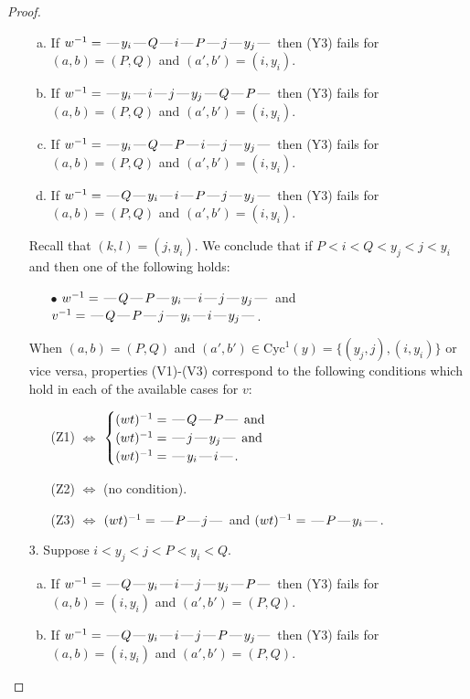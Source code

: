 \documentclass[10pt]{article}
\theoremstyle{definition}
\theoremstyle{definition}
\def\dash{\text{\hspace{0.5mm}---\hspace{0.5mm}}}
\def\Cyc{\mathrm{Cyc}}
\begin{document}
\begin{proof}
\begin{enumerate}
\begin{enumerate}[(a)]
\item If $w^{-1} = \dash y_i\dash Q\dash i\dash P\dash j\dash y_j\dash $ then (Y3) fails for $(a,b)=(P,Q)$ and $(a',b')=(i,y_i)$.
\item If $w^{-1} = \dash y_i\dash i\dash j\dash y_j\dash Q\dash P\dash $ then (Y3) fails for $(a,b)=(P,Q)$ and $(a',b')=(i,y_i)$.
\item If $w^{-1} = \dash y_i\dash Q\dash P\dash i\dash j\dash y_j\dash $ then (Y3) fails for $(a,b)=(P,Q)$ and $(a',b')=(i,y_i)$.
\item If $w^{-1} = \dash Q\dash y_i\dash i\dash P\dash j\dash y_j\dash $ then (Y3) fails for $(a,b)=(P,Q)$ and $(a',b')=(i,y_i)$.
\end{enumerate}
Recall that $(k,l) = (j,y_i)$.
We conclude that if $P < i < Q < y_j < j < y_i$ and then one of the following holds:
\begin{enumerate}
\item[$\bullet$] $w^{-1} = \dash Q\dash P\dash y_i\dash i\dash j\dash y_j\dash $ and $v^{-1} = \dash Q\dash P\dash j\dash y_i\dash i\dash y_j\dash $.
\end{enumerate}
When $(a,b)= (P,Q)$ and $(a',b')\in \Cyc^1(y)=\{(y_j,j),(i,y_i)\}$ or vice versa,
properties (V1)-(V3) correspond to the following conditions which hold in
each of the available cases for $v$:
\begin{enumerate}
\item[](Z1) $\Leftrightarrow$ $\begin{cases}\text{$(wt)^{-1} = \dash Q \dash P \dash$}\text{ and }\\
\text{$(wt)^{-1} = \dash j \dash y_j \dash$}\text{ and }\\
\text{$(wt)^{-1} = \dash y_i \dash i \dash$}.\end{cases}$
\item[](Z2) $\Leftrightarrow$ (no condition).
\item[](Z3) $\Leftrightarrow$ $(wt)^{-1} = \dash P \dash j \dash$  and $(wt)^{-1} = \dash P \dash y_i \dash$.
\end{enumerate}
\item[$3$.] Suppose $i < y_j < j < P < y_i < Q$.
\begin{enumerate}[(a)]
\item If $w^{-1} = \dash Q\dash y_i\dash i\dash j\dash y_j\dash P\dash $ then (Y3) fails for $(a,b)=(i,y_i)$ and $(a',b')=(P,Q)$.
\item If $w^{-1} = \dash Q\dash y_i\dash i\dash j\dash P\dash y_j\dash $ then (Y3) fails for $(a,b)=(i,y_i)$ and $(a',b')=(P,Q)$.

\end{enumerate}
\end{enumerate}
\end{proof}
\end{document}
